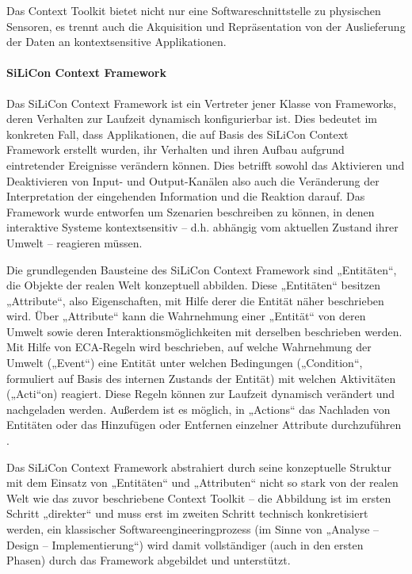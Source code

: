 Das Context Toolkit bietet nicht nur eine Softwareschnittstelle zu physischen Sensoren, es trennt auch die Akquisition und Repräsentation von der Auslieferung der Daten an kontextsensitive Applikationen.

\paragraph{SiLiCon Context Framework} %
\label{par:silicon_context_framework}

Das SiLiCon Context Framework \citep{Beer03} ist ein Vertreter jener Klasse von Frameworks, deren Verhalten zur Laufzeit dynamisch konfigurierbar ist. Dies bedeutet im konkreten Fall, dass Applikationen, die auf Basis des SiLiCon Context Framework erstellt wurden, ihr Verhalten und ihren Aufbau aufgrund eintretender Ereignisse verändern können. Dies betrifft sowohl das Aktivieren und Deaktivieren von Input- und Output-Kanälen also auch die Veränderung der Interpretation der eingehenden Information und die Reaktion darauf. Das Framework wurde entworfen um Szenarien beschreiben zu können, in denen interaktive Systeme kontextsensitiv -- d.h. abhängig vom aktuellen Zustand ihrer Umwelt -- reagieren müssen.

Die grundlegenden Bausteine des SiLiCon Context Framework sind „Entitäten“, die Objekte der realen Welt konzeptuell abbilden. Diese „Entitäten“ besitzen „Attribute“, also Eigenschaften, mit Hilfe derer die Entität näher beschrieben wird. Über „Attribute“ kann die Wahrnehmung einer „Entität“ von deren Umwelt sowie deren Interaktionsmöglichkeiten mit derselben beschrieben werden. Mit Hilfe von \gls{ECA}-Regeln  wird beschrieben, auf welche Wahrnehmung der Umwelt („Event“) eine Entität unter welchen Bedingungen („Condition“, formuliert auf Basis des internen Zustands der Entität) mit welchen Aktivitäten („Acti“on) reagiert. Diese Regeln können zur Laufzeit dynamisch verändert und nachgeladen werden. Außerdem ist es möglich, in „Actions“ das Nachladen von Entitäten oder das Hinzufügen oder Entfernen einzelner Attribute durchzuführen \citep[][S. 90]{Oppl04}.

Das SiLiCon Context Framework abstrahiert durch seine konzeptuelle Struktur mit dem Einsatz von „Entitäten“ und „Attributen“ nicht so stark von der realen Welt wie das zuvor beschriebene Context Toolkit -- die Abbildung ist im ersten Schritt „direkter“ und muss erst im zweiten Schritt technisch konkretisiert werden, ein klassischer Softwareengineeringprozess (im Sinne von „Analyse -- Design -- Implementierung“) wird damit vollständiger (auch in den ersten Phasen) durch das Framework abgebildet und unterstützt. 

